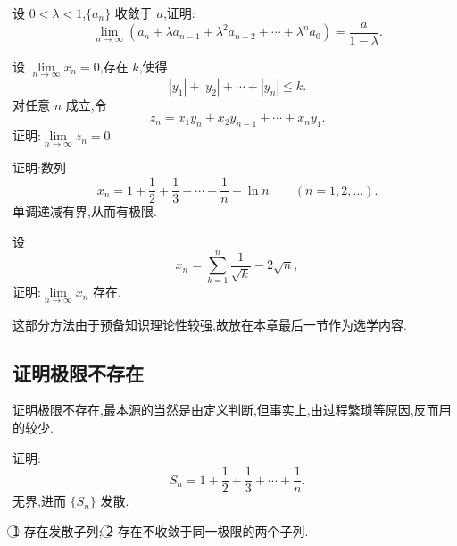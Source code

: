 \documentclass[../数学分析培优讲义.tex]{subfiles}
\begin{document}
\begin{example}
设 $0<\lambda<1$,$\{a_n\}$ 收敛于 $a$,证明:
\[
\lim\limits_{n\to\infty}
\left(a_n+\lambda a_{n-1}+\lambda^2a_{n-2}+\cdots+\lambda^n a_0\right)
=\dfrac{a}{1-\lambda}.
\]
\end{example}
\exampleblank

\begin{example}
设 $\displaystyle \lim\limits_{n\to\infty}x_n=0$,存在 $k$,使得
\[
|y_1|+|y_2|+\cdots+|y_n|\leq k.
\]
对任意 $n$ 成立,令
\[
z_n=x_1y_n+x_2y_{n-1}+\cdots+x_ny_1.
\]
证明:$\displaystyle \lim\limits_{n\to\infty}z_n=0$.
\end{example}
\exampleblank


\newpage


\begin{example}
证明:数列
\[
x_n=1+\dfrac{1}{2}+\dfrac{1}{3}+\cdots+\dfrac{1}{n}-\ln n
\qquad(n=1,2,\ldots).
\]
单调递减有界,从而有极限.
\end{example}
\exampleblank

\begin{example}
设
\[
x_n=\sum\limits_{k=1}^n\dfrac{1}{\sqrt{k}}-2\sqrt{n},
\]
证明:$\displaystyle \lim\limits_{n\to\infty}x_n$ 存在.
\end{example}
\exampleblank


\newpage


这部分方法由于预备知识理论性较强,故放在本章最后一节作为选学内容.


\newpage

\subsection{证明极限不存在}

证明极限不存在,最本源的当然是由定义判断,但事实上,由过程繁琐等原因,反而用的较少.


\newpage


\begin{example}
证明:
\[
S_n=1+\dfrac{1}{2}+\dfrac{1}{3}+\cdots+\dfrac{1}{n}.
\]
无界,进而 $\{S_n\}$ 发散.
\end{example}
\exampleblank


\newpage


\textcircled{1} 存在发散子列;\quad
\textcircled{2} 存在不收敛于同一极限的两个子列.
\end{document}
